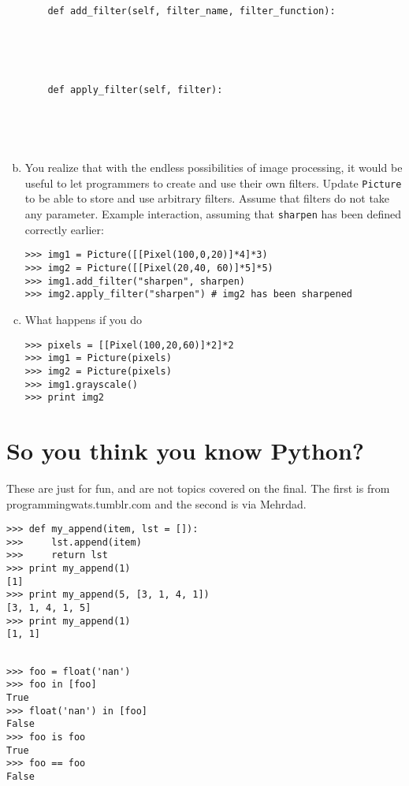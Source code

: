\documentclass[11pt]{article}
\begin{document}
\begin{enumerate}[a)]
\begin{verbatim}
    def add_filter(self, filter_name, filter_function):




        
    def apply_filter(self, filter):
    
    
    
    
\end{verbatim}

\item You realize that with the endless possibilities of image processing, it would be useful to let programmers to create and use their own filters. Update \texttt{Picture} to be able to store and use arbitrary filters. Assume that filters do not take any parameter. Example interaction, assuming that \texttt{sharpen} has been defined correctly earlier:
\begin{verbatim}
>>> img1 = Picture([[Pixel(100,0,20)]*4]*3) 
>>> img2 = Picture([[Pixel(20,40, 60)]*5]*5) 
>>> img1.add_filter("sharpen", sharpen)
>>> img2.apply_filter("sharpen") # img2 has been sharpened
\end{verbatim}

\item What happens if you do
\begin{verbatim}
>>> pixels = [[Pixel(100,20,60)]*2]*2
>>> img1 = Picture(pixels)
>>> img2 = Picture(pixels)
>>> img1.grayscale()
>>> print img2

\end{verbatim}

\end{enumerate}

\section{So you think you know Python?}
\textnormal{These are just for fun, and are not topics covered on the final. The first is from programmingwats.tumblr.com and the second is via Mehrdad.}

\begin{verbatim}
>>> def my_append(item, lst = []):
>>>     lst.append(item)
>>>     return lst
>>> print my_append(1)
[1]
>>> print my_append(5, [3, 1, 4, 1])
[3, 1, 4, 1, 5]
>>> print my_append(1)
[1, 1]
\end{verbatim}


\begin{verbatim}

>>> foo = float('nan')
>>> foo in [foo]
True
>>> float('nan') in [foo]
False
>>> foo is foo
True
>>> foo == foo
False
\end{verbatim}
\end{document}
